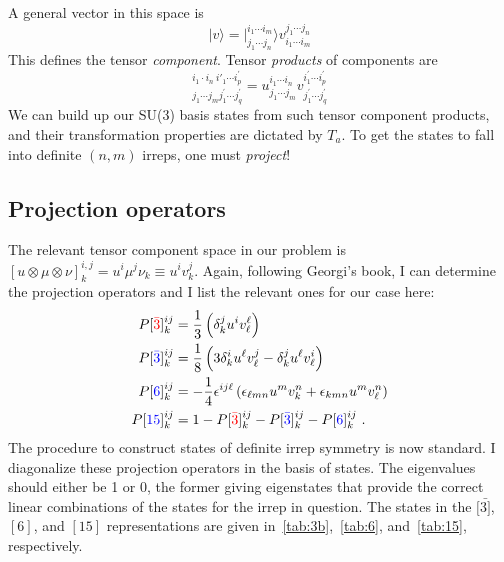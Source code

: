 \documentclass[11pt]{article}
\begin{document}
A general vector in this space is
\begin{displaymath}
| v \rangle =\left.\right| _ { j _ { 1 } \cdots j _ { n } } ^ { i _ { 1 } \cdots i _ { m } } \rangle v _ { i _ { 1 } \cdots i _ { m } } ^ { j _ { 1 } \cdots j _ { n } }
\end{displaymath}
This defines the tensor \emph{component}.  Tensor \emph{products} of components are
\begin{displaymath}
[ u \otimes v ] _ { j _ { 1 } \cdots j _ { m } j _ { 1 } ^ { \prime } \cdots j _ { q } ^ { \prime } } ^ { i _ { 1 } \cdot i_n\ i'_1 \cdots i_ { p } ^ { \prime } } = u _ { j _ { 1 } \cdots j _ { m } } ^ { i _ { 1 } \cdots i _ { n } } v _ { j _ { 1 } ^ { \prime } \cdots j _ { q } ^ { \prime } } ^ { i _ { 1 } ^ { \prime } \cdots i _ { p } ^ { \prime } }
\end{displaymath}
We can build up our SU(3) basis states from such tensor component products, and their transformation properties are dictated by $T_a$.  {\color{red} To get the states to fall into definite $(n,m)$ irreps, one must \emph{project}!}

\subsection{Projection operators}
The relevant tensor component space in our problem is $[u\otimes\mu\otimes\nu]^{i,j}_k=u^i\mu^j\nu_k\equiv u^iv^j_k$. 
Again, following Georgi's book, I can determine the projection operators and I list the relevant ones for our case here:
\begin{align*}
P[{\color{red}\bar{3}}]^{ij}_k&=\frac { 1 } { 3 } \left( \delta _ { k } ^ { j } u ^ { i } v _ { \ell } ^ { \ell }  \right)\\
P[{\color{blue}\bar{3}}]^{ij}_k&=\frac { 1 } { 8 } \left( 3 \delta _ { k } ^ { i } u ^ { \ell } v _ { \ell } ^ { j } - \delta _ { k } ^ { j } u ^ { \ell } v _ { \ell } ^ { i } \right)\\
P[{\color{blue}6}]^{ij}_k&=- \frac { 1 } { 4 } \epsilon ^ { i j \ell } \left( \epsilon _ { \ell m n } u ^ { m } v _ { k } ^ { n } + \epsilon _ { k m n } u ^ { m } v _ { \ell } ^ { n } \right)\\
P[{\color{blue}15}]^{ij}_k&=1-P[{\color{red}\bar{3}}]^{ij}_k-P[{\color{blue}\bar{3}}]^{ij}_k-P[{\color{blue}6}]^{ij}_k\ .
\end{align*}
The procedure to construct states of definite irrep symmetry is now standard.  I diagonalize these projection operators in the basis of states.  The eigenvalues should either be 1 or 0, the former giving eigenstates that provide the correct linear combinations of the states for the irrep in question.  The states in the $[\bar{3]}$, $[6]$, and $[15]$ representations are given in~\autoref{tab:3b},~\autoref{tab:6}, and~\autoref{tab:15}, respectively.
\end{document}
